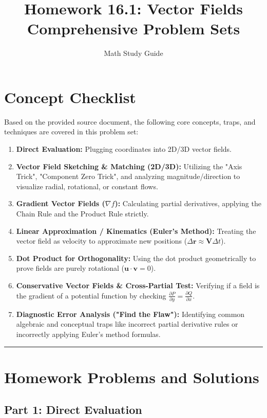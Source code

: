 \documentclass[11pt]{article}
\title{\textbf{Homework 16.1: Vector Fields\\Comprehensive Problem Sets}}
\author{Math Study Guide}
\date{}
\begin{document}
\maketitle

\section*{Concept Checklist}
Based on the provided source document, the following core concepts, traps, and techniques are covered in this problem set:
\begin{enumerate}
    \item \textbf{Direct Evaluation:} Plugging coordinates into 2D/3D vector fields.
    \item \textbf{Vector Field Sketching \& Matching (2D/3D):} Utilizing the "Axis Trick", "Component Zero Trick", and analyzing magnitude/direction to visualize radial, rotational, or constant flows.
    \item \textbf{Gradient Vector Fields ($\nabla f$):} Calculating partial derivatives, applying the Chain Rule and the Product Rule strictly.
    \item \textbf{Linear Approximation / Kinematics (Euler's Method):} Treating the vector field as velocity to approximate new positions ($\Delta \mathbf{r} \approx \mathbf{V} \Delta t$).
    \item \textbf{Dot Product for Orthogonality:} Using the dot product geometrically to prove fields are purely rotational ($\mathbf{u} \cdot \mathbf{v} = 0$).
    \item \textbf{Conservative Vector Fields \& Cross-Partial Test:} Verifying if a field is the gradient of a potential function by checking $\frac{\partial P}{\partial y} = \frac{\partial Q}{\partial x}$.
    \item \textbf{Diagnostic Error Analysis ("Find the Flaw"):} Identifying common algebraic and conceptual traps like incorrect partial derivative rules or incorrectly applying Euler's method formulas.
\end{enumerate}

\hrule\vspace{0.5cm}

\section*{Homework Problems and Solutions}

\subsection*{Part 1: Direct Evaluation}
\end{document}
